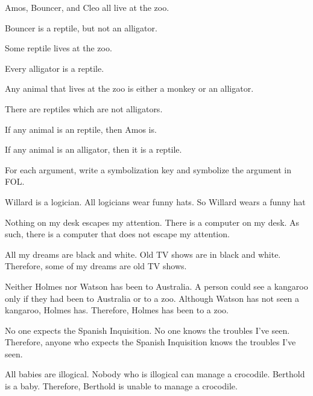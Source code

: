 \begin{earg}
\item Amos, Bouncer, and Cleo all live at the zoo. 
\item Bouncer is a reptile, but not an alligator. 
\item Some reptile lives at the zoo. 
\item Every alligator is a reptile. 
\item Any animal that lives at the zoo is either a monkey or an alligator. 
\item There are reptiles which are not alligators.
\item If any animal is an reptile, then Amos is.
\item If any animal is an alligator, then it is a reptile.
\end{earg}

\problempart
\label{pr.FOLarguments}
For each argument, write a symbolization key and symbolize the argument in FOL.
\begin{earg}
\item Willard is a logician. All logicians wear funny hats. So Willard wears a funny hat
\item Nothing on my desk escapes my attention. There is a computer on my desk. As such, there is a computer that does not escape my attention.
\item All my dreams are black and white. Old TV shows are in black and white. Therefore, some of my dreams are old TV shows.
\item Neither Holmes nor Watson has been to Australia. A person could see a kangaroo only if they had been to Australia or to a zoo. Although Watson has not seen a kangaroo, Holmes has. Therefore, Holmes has been to a zoo.
\item No one expects the Spanish Inquisition. No one knows the troubles I've seen. Therefore, anyone who expects the Spanish Inquisition knows the troubles I've seen.
\item All babies are illogical. Nobody who is illogical can manage a crocodile. Berthold is a baby. Therefore, Berthold is unable to manage a crocodile.
\end{earg}

